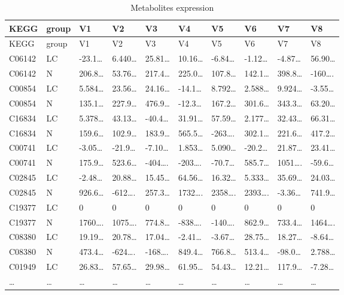 \documentclass[
]{article}
\begin{document}
\begin{longtable}[]{@{}llllllllll@{}}
\caption{\label{tab:metabolites-expression}Metabolites expression}\tabularnewline
\toprule
KEGG & group & V1 & V2 & V3 & V4 & V5 & V6 & V7 & V8\tabularnewline
\midrule
\endfirsthead
\toprule
KEGG & group & V1 & V2 & V3 & V4 & V5 & V6 & V7 & V8\tabularnewline
\midrule
\endhead
C06142 & LC & -23.1\ldots{} & 6.440\ldots{} & 25.81\ldots{} & 10.16\ldots{} & -6.84\ldots{} & -1.12\ldots{} & -4.87\ldots{} & 56.90\ldots{}\tabularnewline
C06142 & N & 206.8\ldots{} & 53.76\ldots{} & 217.4\ldots{} & 225.0\ldots{} & 107.8\ldots{} & 142.1\ldots{} & 398.8\ldots{} & -160\ldots.\tabularnewline
C00854 & LC & 5.584\ldots{} & 23.56\ldots{} & 24.16\ldots{} & -14.1\ldots{} & 8.792\ldots{} & 2.588\ldots{} & 9.924\ldots{} & -3.55\ldots{}\tabularnewline
C00854 & N & 135.1\ldots{} & 227.9\ldots{} & 476.9\ldots{} & -12.3\ldots{} & 167.2\ldots{} & 301.6\ldots{} & 343.3\ldots{} & 63.20\ldots{}\tabularnewline
C16834 & LC & 5.378\ldots{} & 43.13\ldots{} & -40.4\ldots{} & 31.91\ldots{} & 57.59\ldots{} & 2.177\ldots{} & 32.43\ldots{} & 66.31\ldots{}\tabularnewline
C16834 & N & 159.6\ldots{} & 102.9\ldots{} & 183.9\ldots{} & 565.5\ldots{} & -263\ldots. & 302.1\ldots{} & 221.6\ldots{} & 417.2\ldots{}\tabularnewline
C00741 & LC & -3.05\ldots{} & -21.9\ldots{} & -7.10\ldots{} & 1.853\ldots{} & 5.090\ldots{} & -20.2\ldots{} & 21.87\ldots{} & 23.41\ldots{}\tabularnewline
C00741 & N & 175.9\ldots{} & 523.6\ldots{} & -404\ldots. & -203\ldots. & -70.7\ldots{} & 585.7\ldots{} & 1051\ldots. & -59.6\ldots{}\tabularnewline
C02845 & LC & -2.48\ldots{} & 20.88\ldots{} & 15.45\ldots{} & 64.56\ldots{} & 16.32\ldots{} & 5.333\ldots{} & 35.69\ldots{} & 24.03\ldots{}\tabularnewline
C02845 & N & 926.6\ldots{} & -612\ldots. & 257.3\ldots{} & 1732\ldots. & 2358\ldots. & 2393\ldots. & -3.36\ldots{} & 741.9\ldots{}\tabularnewline
C19377 & LC & 0 & 0 & 0 & 0 & 0 & 0 & 0 & 0\tabularnewline
C19377 & N & 1760\ldots. & 1075\ldots. & 774.8\ldots{} & -838\ldots. & -140\ldots. & 862.9\ldots{} & 733.4\ldots{} & 1464\ldots.\tabularnewline
C08380 & LC & 19.19\ldots{} & 20.78\ldots{} & 17.04\ldots{} & -2.41\ldots{} & -3.67\ldots{} & 28.75\ldots{} & 18.27\ldots{} & -8.64\ldots{}\tabularnewline
C08380 & N & 473.4\ldots{} & -624\ldots. & -168\ldots. & 849.4\ldots{} & 766.8\ldots{} & 513.4\ldots{} & -98.0\ldots{} & 2.788\ldots{}\tabularnewline
C01949 & LC & 26.83\ldots{} & 57.65\ldots{} & 29.98\ldots{} & 61.95\ldots{} & 54.43\ldots{} & 12.21\ldots{} & 117.9\ldots{} & -7.28\ldots{}\tabularnewline
\ldots{} & \ldots{} & \ldots{} & \ldots{} & \ldots{} & \ldots{} & \ldots{} & \ldots{} & \ldots{} & \ldots{}\tabularnewline
\bottomrule
\end{longtable}
\end{document}
